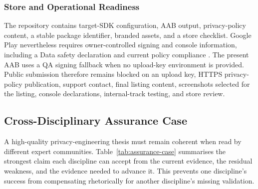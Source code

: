 \subsubsection{Store and Operational Readiness}

The repository contains target-SDK configuration, AAB output, privacy-policy content, a stable package identifier, branded assets, and a store checklist. Google Play nevertheless requires owner-controlled signing and console information, including a Data safety declaration and current policy compliance \cite{playdatasafety2026,playtarget2026}. The present AAB uses a QA signing fallback when no upload-key environment is provided. Public submission therefore remains blocked on an upload key, HTTPS privacy-policy publication, support contact, final listing content, screenshots selected for the listing, console declarations, internal-track testing, and store review.

\subsection{Cross-Disciplinary Assurance Case}

A high-quality privacy-engineering thesis must remain coherent when read by different expert communities. Table~\ref{tab:assurance-case} summarises the strongest claim each discipline can accept from the current evidence, the residual weakness, and the evidence needed to advance it. This prevents one discipline's success from compensating rhetorically for another discipline's missing validation.

